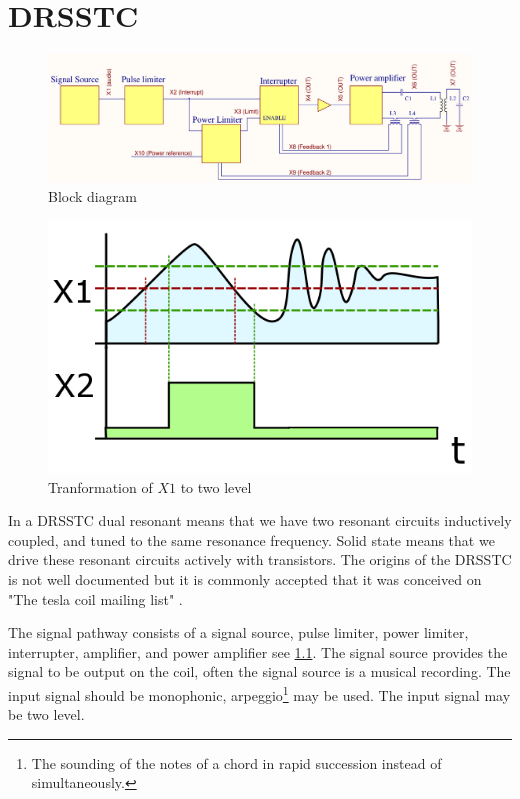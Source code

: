 \chapter{DRSSTC}
\label{DRSSTC}

\begin{figure}
    \centering
    \includegraphics[width=\textwidth]{Skjema/FunksjonsBlokkskjema.pdf}
    \caption{Block diagram}
    \label{fig:func_block}
\end{figure}

\begin{figure}
    \centering
    \includegraphics[width=\textwidth]{img/Smitt_hysteresis_graph_x1_x2.png}
    \caption{Tranformation of $X1$ to two level \citep{wikimedia}}       
    \label{fig:schmidt}
\end{figure}


In a DRSSTC dual resonant means that we have two resonant circuits inductively coupled, and tuned to the same resonance frequency. Solid state means that we drive these resonant circuits actively with transistors. The origins of the DRSSTC is not well documented but it is commonly accepted that it was conceived on "The tesla coil mailing list" \citep{pupman}.

The signal pathway consists of a signal source, pulse limiter, power limiter, interrupter, amplifier, and power amplifier see \cref{fig:func_block}.
The signal source provides the signal to be output on the coil, often the signal source is a musical recording.
The input signal should be monophonic, arpeggio\footnote{The sounding of the notes of a chord in rapid succession instead of simultaneously.} may be used. The input signal may be two level.

